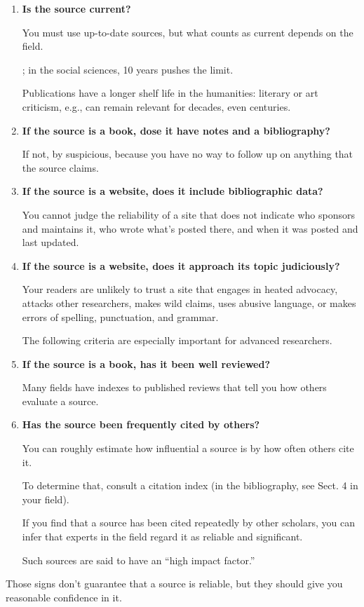 \documentclass[oneside]{book}
\numberwithin{equation}{section}
\begin{document}
\begin{enumerate}
    A website is only as reputable as its sponsor.
    
    You can usually trust one that is sponsored and maintained by a reputable organization.
    
    Some sites run by individuals are reliable; most are not.
    
    Do a web search for the name of the sponsor.
    \item \textbf{Is the source current?}
    
    You must use up-to-date sources, but what counts as current depends on the field.
    
    ; in the social sciences, 10 years pushes the limit.
    
    Publications have a longer shelf life in the humanities: literary or art criticism, e.g., can remain relevant for decades, even centuries.
    \item \textbf{If the source is a book, dose it have notes and a bibliography?}
    
    If not, by suspicious, because you have no way to follow up on anything that the source claims.
    \item \textbf{If the source is a website, does it include bibliographic data?}
    
    You cannot judge the reliability of a site that does not indicate who sponsors and maintains it, who wrote what's posted there, and when it was posted and last updated.
    \item \textbf{If the source is a website, does it approach its topic judiciously?}
    
    Your readers are unlikely to trust a site that engages in heated advocacy, attacks other researchers, makes wild claims, uses abusive language, or makes errors of spelling, punctuation, and grammar.
    
    The following criteria are especially important for advanced researchers.
    \item \textbf{If the source is a book, has it been well reviewed?}
    
    Many fields have indexes to published reviews that tell you how others evaluate a source.
    \item \textbf{Has the source been frequently cited by others?}
    
    You can roughly estimate how influential a source is by how often others cite it.
    
    To determine that, consult a citation index (in the bibliography, see Sect. 4 in your field).
    
    If you find that a source has been cited repeatedly by other scholars, you can infer that experts in the field regard it as reliable and significant.
    
    Such sources are said to have an ``high impact factor.''
\end{enumerate}
Those signs don't guarantee that a source is reliable, but they should give you reasonable confidence in it.
\end{document}
